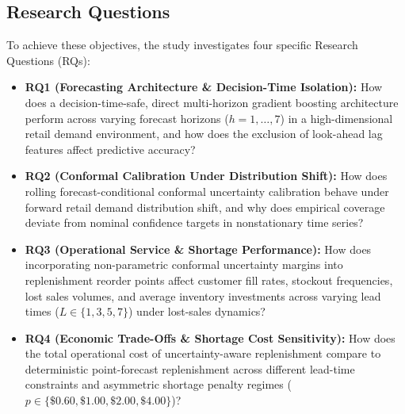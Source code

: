 \documentclass[11pt,a4paper]{article}
\begin{document}
\subsection{Research Questions}
\label{sec:intro_rqs}
To achieve these objectives, the study investigates four specific Research Questions (RQs):
\begin{itemize}
    \item \textbf{RQ1 (Forecasting Architecture \& Decision-Time Isolation):} How does a decision-time-safe, direct multi-horizon gradient boosting architecture perform across varying forecast horizons ($h=1,\dots,7$) in a high-dimensional retail demand environment, and how does the exclusion of look-ahead lag features affect predictive accuracy?
    \item \textbf{RQ2 (Conformal Calibration Under Distribution Shift):} How does rolling forecast-conditional conformal uncertainty calibration behave under forward retail demand distribution shift, and why does empirical coverage deviate from nominal confidence targets in nonstationary time series?
    \item \textbf{RQ3 (Operational Service \& Shortage Performance):} How does incorporating non-parametric conformal uncertainty margins into replenishment reorder points affect customer fill rates, stockout frequencies, lost sales volumes, and average inventory investments across varying lead times ($L \in \{1, 3, 5, 7\}$) under lost-sales dynamics?
    \item \textbf{RQ4 (Economic Trade-Offs \& Shortage Cost Sensitivity):} How does the total operational cost of uncertainty-aware replenishment compare to deterministic point-forecast replenishment across different lead-time constraints and asymmetric shortage penalty regimes ($p \in \{\$0.60, \$1.00, \$2.00, \$4.00\}$)?
\end{itemize}
\end{document}
